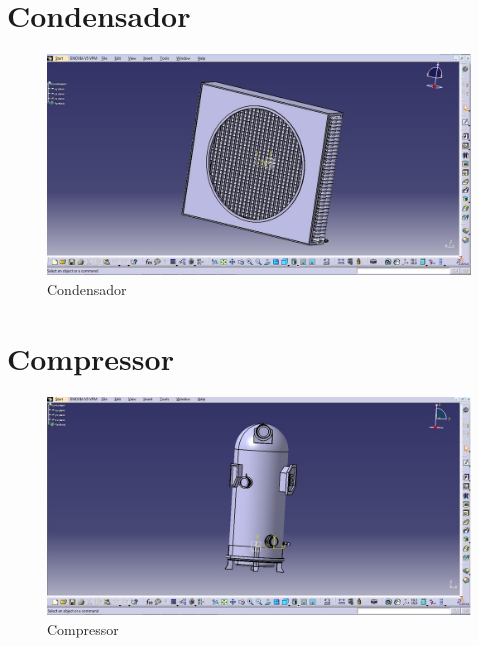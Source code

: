 \section{Condensador}
\begin{figure}[!htbp]
	  \centering
	  \includegraphics[scale=0.45]{editaveis/figuras/C_condensador_correto}
	  \caption[Condensador]{Condensador}
	  \label{Condensador}
	\end{figure}
	\FloatBarrier

\section{Compressor}
\begin{figure}[!htbp]
	  \centering
	  \includegraphics[scale=0.45]{editaveis/figuras/C_compressor}
	  \caption[Compressor]{Compressor}
	  \label{Compressor}
	\end{figure}
	\FloatBarrier	

